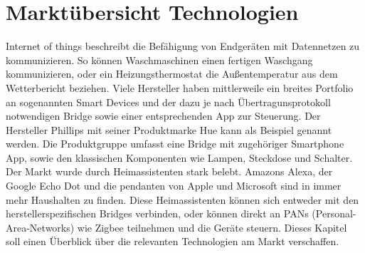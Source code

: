 \chapter{Marktübersicht Technologien}

\grqq Internet of things\grqq{} beschreibt die Befähigung von Endgeräten mit Datennetzen zu kommunizieren. So können Waschmaschinen einen fertigen Waschgang kommunizieren,
oder ein Heizungsthermostat die Außentemperatur aus dem Wetterbericht beziehen. Viele Hersteller haben mittlerweile ein breites Portfolio an sogenannten \grqq Smart Devices\grqq{} und der dazu
je nach Übertragunsprotokoll notwendigen \grqq Bridge\grqq{} sowie einer entsprechenden App zur Steuerung. Der Hersteller Phillips mit seiner Produktmarke \grqq Hue\grqq{}
kann als Beispiel genannt werden. Die Produktgruppe umfasst eine Bridge mit zugehöriger Smartphone App, sowie den klassischen Komponenten wie Lampen, Steckdose und Schalter.
Der Markt wurde durch Heimassistenten stark belebt. Amazons Alexa, der Google Echo Dot und die pendanten von Apple und Microsoft sind in immer mehr Haushalten zu finden.
Diese Heimassistenten können sich entweder mit den herstellerspezifischen Bridges verbinden, oder können direkt an PANs (Personal-Area-Networks) wie Zigbee
teilnehmen und die Geräte steuern. Dieses Kapitel soll einen Überblick über die relevanten Technologien am Markt verschaffen. 

